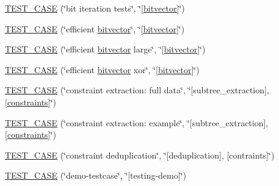 \begin{DoxyCompactItemize}
\item 
\hyperlink{namespaceterraces_1_1tests_ab4e0b5e0eabba8652b4b1989df8a5a61}{T\+E\+S\+T\+\_\+\+C\+A\+SE} (\char`\"{}bit iteration tests\char`\"{}, \char`\"{}\mbox{[}\hyperlink{namespaceterraces_a1b526fb554dff829f7ad51eb21d5ed06}{bitvector}\mbox{]}\char`\"{})
\item 
\hyperlink{namespaceterraces_1_1tests_ade0715fb3d82dadd9b86a6d3f8fa7edf}{T\+E\+S\+T\+\_\+\+C\+A\+SE} (\char`\"{}efficient \hyperlink{namespaceterraces_a1b526fb554dff829f7ad51eb21d5ed06}{bitvector}\char`\"{}, \char`\"{}\mbox{[}\hyperlink{namespaceterraces_a1b526fb554dff829f7ad51eb21d5ed06}{bitvector}\mbox{]}\char`\"{})
\item 
\hyperlink{namespaceterraces_1_1tests_a314e3e493ab57fdd33473cb5520d98de}{T\+E\+S\+T\+\_\+\+C\+A\+SE} (\char`\"{}efficient \hyperlink{namespaceterraces_a1b526fb554dff829f7ad51eb21d5ed06}{bitvector} large\char`\"{}, \char`\"{}\mbox{[}\hyperlink{namespaceterraces_a1b526fb554dff829f7ad51eb21d5ed06}{bitvector}\mbox{]}\char`\"{})
\item 
\hyperlink{namespaceterraces_1_1tests_adfe3e28e69f3a10922a562179e6498b5}{T\+E\+S\+T\+\_\+\+C\+A\+SE} (\char`\"{}efficient \hyperlink{namespaceterraces_a1b526fb554dff829f7ad51eb21d5ed06}{bitvector} xor\char`\"{}, \char`\"{}\mbox{[}\hyperlink{namespaceterraces_a1b526fb554dff829f7ad51eb21d5ed06}{bitvector}\mbox{]}\char`\"{})
\item 
\hyperlink{namespaceterraces_1_1tests_a950a8b48ff4f0cd9e2a603ba141c1ea1}{T\+E\+S\+T\+\_\+\+C\+A\+SE} (\char`\"{}constraint extraction\+: full data\char`\"{}, \char`\"{}\mbox{[}subtree\+\_\+extraction\mbox{]},\mbox{[}\hyperlink{namespaceterraces_a6f603ffd30ed4d902fce6424492e0581}{constraints}\mbox{]}\char`\"{})
\item 
\hyperlink{namespaceterraces_1_1tests_a0a62a06d75475fb1a9c587e4737b6aa7}{T\+E\+S\+T\+\_\+\+C\+A\+SE} (\char`\"{}constraint extraction\+: example\char`\"{}, \char`\"{}\mbox{[}subtree\+\_\+extraction\mbox{]},\mbox{[}\hyperlink{namespaceterraces_a6f603ffd30ed4d902fce6424492e0581}{constraints}\mbox{]}\char`\"{})
\item 
\hyperlink{namespaceterraces_1_1tests_a709fe61392d714f5770c601c63d47b19}{T\+E\+S\+T\+\_\+\+C\+A\+SE} (\char`\"{}constraint deduplication\char`\"{}, \char`\"{}\mbox{[}deduplication\mbox{]}, \mbox{[}contraints\mbox{]}\char`\"{})
\item 
\hyperlink{namespaceterraces_1_1tests_a6192f735c7a0b588edcaad99a9d56d75}{T\+E\+S\+T\+\_\+\+C\+A\+SE} (\char`\"{}demo-\/testcase\char`\"{}, \char`\"{}\mbox{[}testing-\/demo\mbox{]}\char`\"{})

\end{DoxyCompactItemize}
